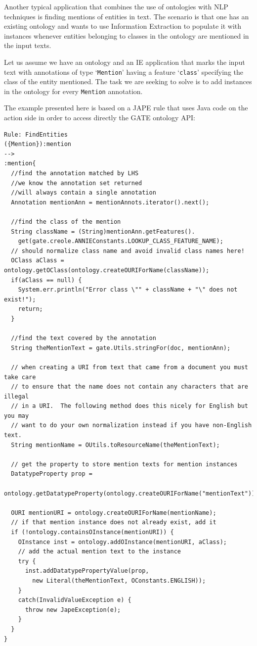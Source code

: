{Another typical application that combines the use of ontologies with NLP techniques 
is finding mentions of entities in text. The scenario is that one has an 
existing ontology and wants to use Information Extraction to populate it with 
instances whenever entities belonging to classes in the ontology are mentioned 
in the input texts. 

Let us assume we have an ontology and an IE application that marks the input 
text with annotations of type `{\tt Mention}' having a feature `{\tt class}' 
specifying the class of the entity mentioned. The task we are seeking to solve 
is to add instances in the ontology for every {\tt Mention} annotation.

The example presented here is based on a JAPE rule that uses Java code on the 
action side in order to access directly the GATE ontology API:

\begin{lstlisting}
Rule: FindEntities
({Mention}):mention
-->
:mention{
  //find the annotation matched by LHS
  //we know the annotation set returned
  //will always contain a single annotation
  Annotation mentionAnn = mentionAnnots.iterator().next();
  
  //find the class of the mention
  String className = (String)mentionAnn.getFeatures().
    get(gate.creole.ANNIEConstants.LOOKUP_CLASS_FEATURE_NAME);
  // should normalize class name and avoid invalid class names here!
  OClass aClass = ontology.getOClass(ontology.createOURIForName(className));
  if(aClass == null) { 
    System.err.println("Error class \"" + className + "\" does not exist!");
    return; 
  } 
    
  //find the text covered by the annotation
  String theMentionText = gate.Utils.stringFor(doc, mentionAnn);
  
  // when creating a URI from text that came from a document you must take care
  // to ensure that the name does not contain any characters that are illegal
  // in a URI.  The following method does this nicely for English but you may
  // want to do your own normalization instead if you have non-English text.
  String mentionName = OUtils.toResourceName(theMentionText);

  // get the property to store mention texts for mention instances
  DatatypeProperty prop =
    ontology.getDatatypeProperty(ontology.createOURIForName("mentionText"));

  OURI mentionURI = ontology.createOURIForName(mentionName);
  // if that mention instance does not already exist, add it
  if (!ontology.containsOInstance(mentionURI)) {
    OInstance inst = ontology.addOInstance(mentionURI, aClass);
    // add the actual mention text to the instance
    try {
      inst.addDatatypePropertyValue(prop, 
        new Literal(theMentionText, OConstants.ENGLISH));
    }
    catch(InvalidValueException e) {
      throw new JapeException(e);
    }
  }
}
\end{lstlisting}

}
